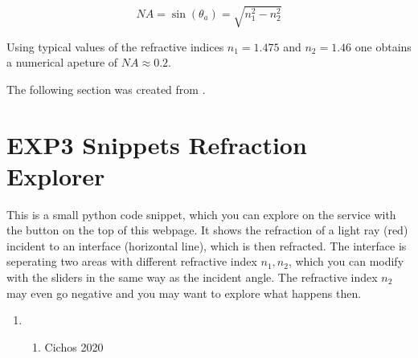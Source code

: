 \documentclass[letterpaper,10pt,english]{sphinxmanual}
\begin{document}
\sphinxAtStartPar
\begin{equation}
NA=\sin(\theta_a)=\sqrt{n_1^2-n_2^{2}}
\end{equation}

\sphinxAtStartPar
Using typical values of the refractive indices \(n_1=1.475\) and \(n_2=1.46\) one obtains a numerical apeture of \(NA\approx 0.2\).

\sphinxAtStartPar
The following section was created from .


\chapter{EXP3 Snippets \textendash{} Refraction Explorer}
\label{\detokenize{snippets/Refraction Explorer:EXP3-Snippets-_-Refraction-Explorer}}\label{\detokenize{snippets/Refraction Explorer::doc}}
\sphinxAtStartPar
This is a small python code snippet, which you can explore on the  service with the button on the top of this webpage. It shows the refraction of a light ray (red) incident to an interface (horizontal line), which is then refracted. The interface is seperating two areas with different refractive index \(n_1, n_2\), which you can modify with the sliders in the same way as the incident angle. The refractive index \(n_2\) may even go negative and you may want to explore what
happens then.
\begin{enumerate}
%
\setcounter{enumi}{2}
\item {} \begin{enumerate}
%
\setcounter{enumii}{5}
\item {} 
\sphinxAtStartPar
Cichos 2020

\end{enumerate}

\end{enumerate}
\end{document}
